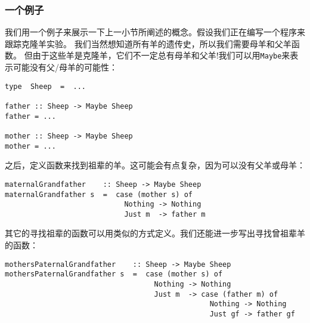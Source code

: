 \subsubsection{一个例子}
\indent{}我们用一个例子来展示一下上一小节所阐述的概念。假设我们正在编写一个程序来跟踪克隆羊实验。
我们当然想知道所有羊的遗传史，所以我们需要母羊和父羊函数。
但由于这些羊是克隆羊，它们不一定总有母羊和父羊!我们可以用\texttt{Maybe}来表示可能没有父/母羊的可能性：
\begin{verbatim}
type  Sheep  =  ...

father :: Sheep -> Maybe Sheep
father = ...

mother :: Sheep -> Maybe Sheep
mother = ...
\end{verbatim}
\noindent{}之后，定义函数来找到祖辈的羊。这可能会有点复杂，因为可以没有父羊或母羊：
\begin{verbatim}
maternalGrandfather    :: Sheep -> Maybe Sheep
maternalGrandfather s  =  case (mother s) of
                            Nothing -> Nothing
                            Just m  -> father m
\end{verbatim}
\noindent{}其它的寻找祖辈的函数可以用类似的方式定义。我们还能进一步写出寻找曾祖辈羊的函数：
\begin{verbatim}
mothersPaternalGrandfather    :: Sheep -> Maybe Sheep
mothersPaternalGrandfather s  =  case (mother s) of
                                   Nothing -> Nothing
                                   Just m  -> case (father m) of
                                                Nothing -> Nothing
                                                Just gf -> father gf
\end{verbatim}

